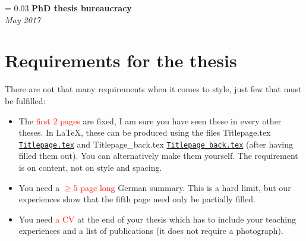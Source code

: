 \documentclass[a4paper]{article}
\newlength{\titleVerticalSpacing}
\newcommand{\myTitle}[2]{%
    \begingroup
        \titleVerticalSpacing = 0.03\textheight
        \centering
        \vspace*{\titleVerticalSpacing}
        {\Huge\bfseries #1}\\[\baselineskip]
        {\itshape #2}\\[3\baselineskip]
    \endgroup
}
\newcommand{\attention}[1]{\textcolor{red}{#1}}
\newcommand{\file}[2][]{%
    \ifthenelse{\isempty{#1}}%
        {\textcolor{fileColor}{#2}}%
        {\href{run:#1}{\texttt{\textcolor{fileColor}{#2}}}}%
}
\begin{document}
    
    \myTitle{PhD thesis bureaucracy}{May 2017}

    \section*{Requirements for the thesis}
        There are not that many requirements when it comes to style, just few that must be fulfilled:
        \begin{itemize}
            \item The \attention{first $2$ pages} are fixed, I am sure you have seen these in every other theses.
                  In \LaTeX, these can be produced using the files \file{Titlepage.tex} and \file{Titlepage\_back.tex} (after having filled them out).
                  You can alternatively make them yourself. The requirement is on content, not on style and spacing.
            \item You need a \attention{$\geq 5$ page long} German summary. This is a hard limit, but our experiences show that the fifth page need
              only be partially filled.
            \item You need \attention{a CV} at the end of your thesis which has to include your teaching experiences and a list of publications
              (it does not require a photograph).
        \end{itemize}
        
        
\end{document}
